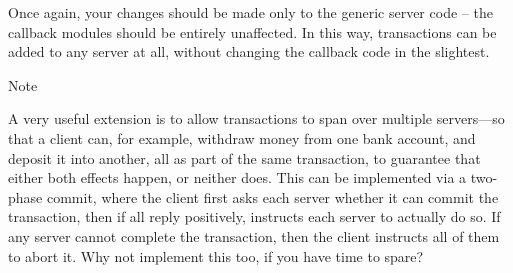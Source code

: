 \documentclass{article}
\begin{document}
Once again, your changes should be made only to the generic server
code -- the callback modules should be entirely unaffected. In this way,
transactions can be added to any server at all, without changing the
callback code in the slightest.

Note

A very useful extension is to allow transactions to span over multiple
servers—so that a client can, for example, withdraw money from one
bank account, and deposit it into another, all as part of the same
transaction, to guarantee that either both effects happen, or neither
does. This can be implemented via a two-phase commit, where the client
first asks each server whether it can commit the transaction, then if
all reply positively, instructs each server to actually do so. If any
server cannot complete the transaction, then the client instructs all
of them to abort it. Why not implement this too, if you have time to
spare?
\end{document}
